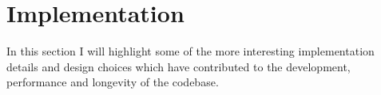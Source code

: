 \section{Implementation}

In this section I will highlight some of the more interesting implementation details and design choices which have contributed to the development, performance and longevity of the codebase.



